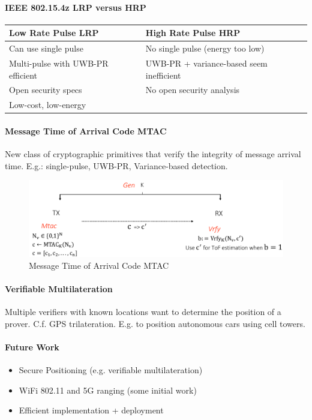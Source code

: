 \paragraph{IEEE 802.15.4z LRP versus HRP}
\mbox{}
\begin{table}[h]
\centering
\begin{tabular}{ll}
Low Rate Pulse LRP & High Rate Pulse HRP\\
\hline
Can use single pulse & No single pulse (energy too low) \\
Multi-pulse with UWB-PR efficient & UWB-PR + variance-based seem inefficient \\
Open security specs & No open security analysis \\
Low-cost, low-energy &
\end{tabular}
\end{table}

\paragraph{Message Time of Arrival Code MTAC}
New class of cryptographic primitives that verify the integrity of message arrival time.
E.g.: single-pulse, UWB-PR, Variance-based detection.

\begin{figure}
	\centering
	\includegraphics[scale=0.4]{images/5-mtac.png}
	\caption{Message Time of Arrival Code MTAC}
	\label{fig:mtac}
\end{figure}

\paragraph{Verifiable Multilateration}
Multiple verifiers with known locations want to determine the position of a prover.
C.f. GPS trilateration.
E.g. to position autonomous cars using cell towers.

\paragraph{Future Work}
\begin{itemize}
	\item Secure Positioning (e.g. verifiable multilateration)
	\item WiFi 802.11 and 5G ranging (some initial work)
	\item Efficient implementation + deployment
\end{itemize}
